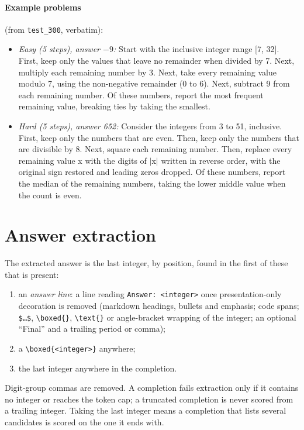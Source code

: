 \documentclass{article}
\begin{document}
\paragraph{Example problems} (from \texttt{test\_300}, verbatim):
\begin{itemize}\small
  \item \emph{Easy (5 steps), answer $-9$:} Start with the inclusive integer range [7, 32]. First, keep only the values that leave no remainder when divided by 7. Next, multiply each remaining number by 3. Next, take every remaining value modulo 7, using the non-negative remainder (0 to 6). Next, subtract 9 from each remaining number. Of these numbers, report the most frequent remaining value, breaking ties by taking the smallest.
  \item \emph{Hard (5 steps), answer 652:} Consider the integers from 3 to 51, inclusive. First, keep only the numbers that are even. Then, keep only the numbers that are divisible by 8. Next, square each remaining number. Then, replace every remaining value x with the digits of $|$x$|$ written in reverse order, with the original sign restored and leading zeros dropped. Of these numbers, report the median of the remaining numbers, taking the lower middle value when the count is even.
\end{itemize}

\section{Answer extraction}
\label{app:extraction}

The extracted answer is the last integer, by position, found in the first of these that is present:
\begin{enumerate}
  \item an \emph{answer line}: a line reading \texttt{Answer: <integer>} once presentation-only decoration is removed (markdown headings, bullets and emphasis; code spans; \texttt{\$\ldots\$}, \verb|\boxed{}|, \verb|\text{}| or angle-bracket wrapping of the integer; an optional ``Final'' and a trailing period or comma);
  \item a \verb|\boxed{<integer>}| anywhere;
  \item the last integer anywhere in the completion.
\end{enumerate}
Digit-group commas are removed. A completion fails extraction only if it contains no integer or reaches the token cap; a truncated completion is never scored from a trailing integer. Taking the last integer means a completion that lists several candidates is scored on the one it ends with.
\end{document}
